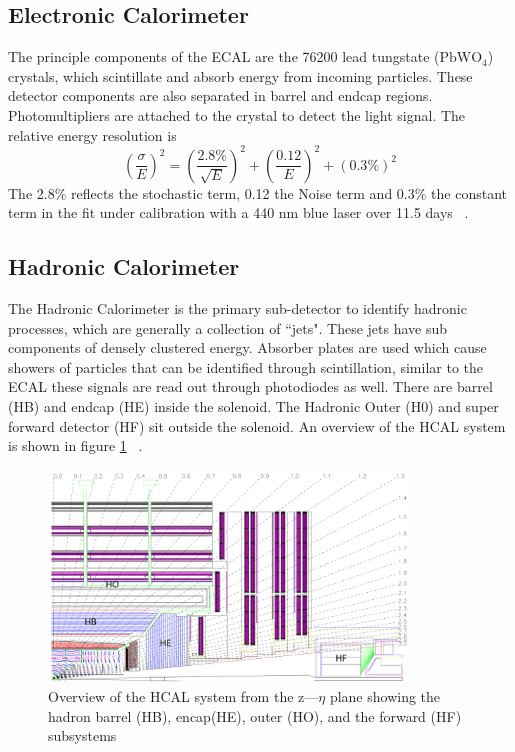 \subsection{Electronic Calorimeter}

The principle components of the ECAL are the 76200 lead tungstate ($\text{PbWO}_4$) crystals, which scintillate and absorb energy from incoming particles. These detector components are also separated in barrel and endcap regions. Photomultipliers are attached to the crystal to detect the light signal. The relative energy resolution is 
\begin{equation*}
\label{eq:ecal}
\left(\frac{\sigma}{E}\right)^2 = \left( \frac{2.8\%}{\sqrt{E}}  \right)^2 + \left( \frac{0.12}{E}  \right)^2 + (0.3\%)^2 
\end{equation*}
The 2.8\% reflects the stochastic term, 0.12 the Noise term and 0.3\% the constant term in the fit under calibration with a 440 nm blue laser over 11.5 days ~\cite{Chatrchyan:2008zzk,Eichhorn:2112017}. 

\subsection{Hadronic Calorimeter} 
The Hadronic Calorimeter is the primary sub-detector to identify hadronic processes, which are generally a collection of ``jets". These jets have sub components of densely clustered energy. Absorber plates are used which cause showers of particles that can be identified through scintillation, similar to the ECAL these signals are read out through photodiodes as well. There are barrel (HB) and endcap (HE) inside the solenoid. The Hadronic Outer (H0) and super forward detector (HF) sit outside the solenoid. An overview of the HCAL system is shown in figure \ref{fig:hcal} ~\cite{Chatrchyan:2008zzk,Eichhorn:2112017}. 

\begin{figure}[ht!b]
  \centering
\includegraphics[width=0.85\textwidth]{figures/HCAL.png}    
    \caption{\label{fig:hcal} Overview of the HCAL system from the z---$\eta$ plane showing the hadron barrel (HB), encap(HE), outer (HO), and the forward (HF) subsystems ~\cite{Chatrchyan:2008zzk}}
\end{figure}




